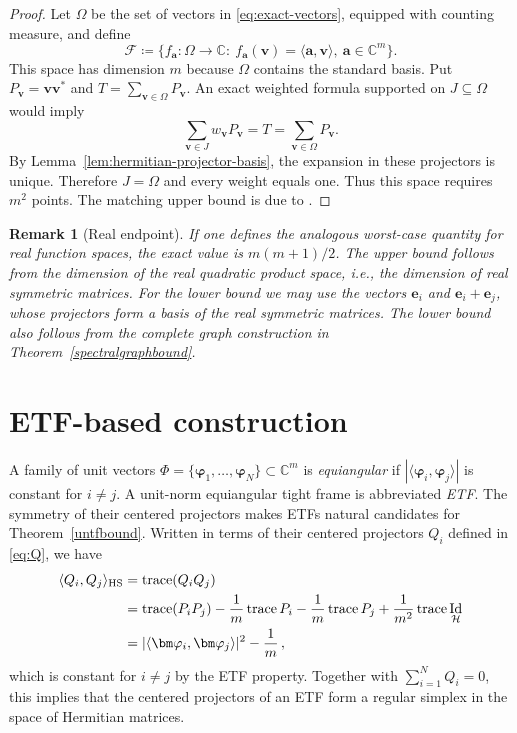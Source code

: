 \documentclass[a4paper]{amsart}
\numberwithin{equation}{section}
\newtheorem{remark}[theorem]{Remark}
\DeclareMathOperator{\trace}{trace}
\DeclareMathOperator{\Id}{Id}
\begin{document}
\begin{proof}
    Let $\Omega$ be the set of vectors in \eqref{eq:exact-vectors}, equipped with counting measure, and define
    \begin{equation*}
        \mathcal F\coloneqq\{f_{\bm a}:\Omega\to\mathds C:\ f_{\bm a}(\bm v)=\langle\bm a,\bm v\rangle,\ \bm a\in\mathds C^m\}.
    \end{equation*}
    This space has dimension $m$ because $\Omega$ contains the standard basis.
    Put $P_{\bm v}=\bm v\bm v^*$ and $T=\sum_{\bm v\in\Omega}P_{\bm v}$.
    An exact weighted formula supported on $J\subseteq\Omega$ would imply
    \begin{equation*}
        \sum_{\bm v\in J}w_{\bm v}P_{\bm v}=T
        =\sum_{\bm v\in\Omega}P_{\bm v}.
    \end{equation*}
    By Lemma~\ref{lem:hermitian-projector-basis}, the expansion in these projectors is unique.
    Therefore $J=\Omega$ and every weight equals one.
    Thus this space requires $m^2$ points.
    The matching upper bound is due to \cite{BKPSU25, ST25}.
\end{proof}

\begin{remark}[Real endpoint]\label{rem:real-endpoint}
    If one defines the analogous worst-case quantity for real function spaces, the exact value is $m(m+1)/2$.
    The upper bound follows from the dimension of the real quadratic product space, i.e., the dimension of real symmetric matrices.
    For the lower bound we may use the vectors $\bm e_i$ and $\bm e_i+\bm e_j$, whose projectors form a basis of the real symmetric matrices.
    The lower bound also follows from the complete graph construction in Theorem~\ref{spectralgraphbound}.
\end{remark}
 \section{ETF-based construction}\label{sec:etf}

A family of unit vectors $\Phi=\{\bm\varphi_1,\dots,\bm\varphi_N\}\subset\mathds C^m$ is \emph{equiangular} if $|\langle\bm\varphi_i,\bm\varphi_j\rangle|$ is constant for $i\ne j$.
A unit-norm equiangular tight frame is abbreviated \emph{ETF}.
The symmetry of their centered projectors makes ETFs natural candidates for Theorem~\ref{untfbound}.
Written in terms of their centered projectors $Q_i$ defined in \eqref{eq:Q}, we have
\begin{align}
    \langle Q_i,Q_j\rangle_{\rm HS}
    &= \trace(Q_i Q_j) \nonumber\\
    &= \trace(P_iP_j) - \frac 1m \trace P_i - \frac 1m \trace P_j + \frac{1}{m^2} \trace\Id_{\mathcal H} \nonumber\\
    &= |\langle\bm\varphi_i,\bm\varphi_j\rangle|^2 - \frac 1m \,, \label{eq:simplex}
\end{align}
which is constant for $i\ne j$ by the ETF property.
Together with $\sum_{i=1}^{N}Q_i = 0$, this implies that the centered projectors of an ETF form a regular simplex in the space of Hermitian matrices.
\end{document}
